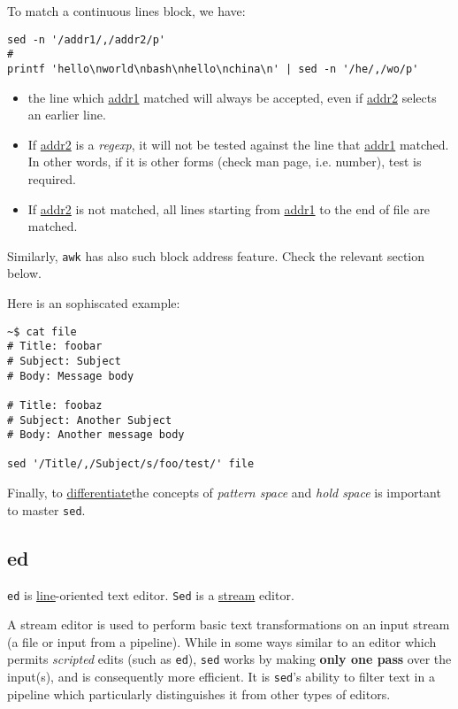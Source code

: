 To match a continuous lines block, we have:

\begin{lstlisting}
sed -n '/addr1/,/addr2/p'
#
printf 'hello\nworld\nbash\nhello\nchina\n' | sed -n '/he/,/wo/p'
\end{lstlisting}

\begin{itemize}
\item the line which \uline{addr1} matched will always be
  accepted, even if \uline{addr2} selects an earlier line.
\item If \uline{addr2} is a \textit{regexp}, it will not be tested
  against the line that \uline{addr1} matched. In other words, if
  it is other forms (check man page, i.e. number), test is
  required.
\item If \uline{addr2} is not matched, all lines starting from
  \uline{addr1} to the end of file are matched.
\end{itemize}

Similarly, \lstinline|awk| has also such block address
feature. Check the relevant section below.

Here is an sophiscated example:

\begin{lstlisting}
~$ cat file
# Title: foobar
# Subject: Subject
# Body: Message body

# Title: foobaz
# Subject: Another Subject
# Body: Another message body

sed '/Title/,/Subject/s/foo/test/' file
\end{lstlisting}

Finally, to
\href{https://stackoverflow.com/q/12833714}{differentiate}the
concepts of \textit{pattern space} and \textit{hold space} is
important to master \lstinline|sed|.

\subsection{ed}
\label{sec:bash-ed}

\lstinline|ed| is \uline{line}-oriented text
editor. \lstinline|Sed| is a \uline{stream} editor.

A stream editor is used to perform basic text transformations on
an input stream (a file or input from a pipeline). While in some
ways similar to an editor which permits \textit{scripted} edits
(such as \lstinline{ed}), \lstinline|sed| works by making
\textbf{only one pass} over the input(s), and is consequently more
efficient. It is \lstinline|sed|'s ability to filter text in a
pipeline which particularly distinguishes it from other types of
editors.

